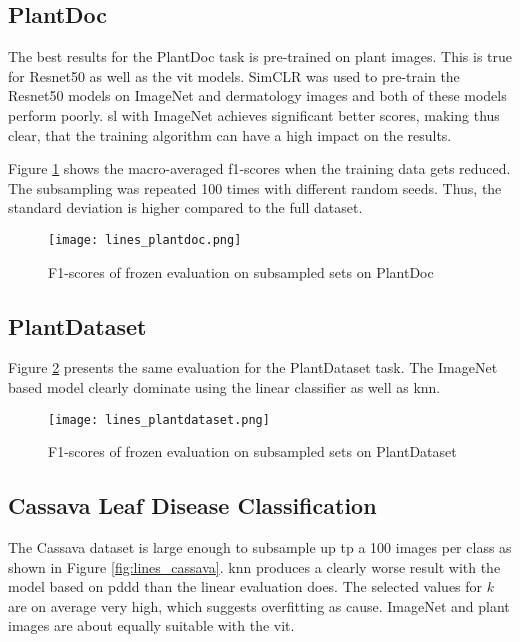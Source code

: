 \subsection{PlantDoc}
The best results for the PlantDoc task is pre-trained on plant images. 
This is true for Resnet50 as well as the \gls{vit} models.
SimCLR was used to pre-train the Resnet50 models on ImageNet and dermatology images and both of these models perform poorly.
\gls{sl} with ImageNet achieves significant better scores, making thus clear, that the training algorithm can have a high impact on the results. 

Figure \ref{fig:lines_plantdoc} shows the macro-averaged f1-scores when the training data gets reduced.
The subsampling was repeated 100 times with different random seeds. 
Thus, the standard deviation is higher compared to the full dataset.

\begin{figure}[H]
    \begin{center}
    \texttt{[image: lines\_plantdoc.png]}
    \caption{F1-scores of frozen evaluation on subsampled sets on PlantDoc}\label{fig:lines_plantdoc}
    \end{center}
\end{figure}

\subsection{PlantDataset}
Figure \ref{fig:lines_plantdataset} presents the same evaluation for the PlantDataset task.
The ImageNet based model clearly dominate using the linear classifier as well as \gls{knn}.
\begin{figure}[H]
    \begin{center}
    \texttt{[image: lines\_plantdataset.png]}
    \caption{F1-scores of frozen evaluation on subsampled sets on PlantDataset}\label{fig:lines_plantdataset}
    \end{center}
\end{figure}

\subsection{Cassava Leaf Disease Classification}
The Cassava dataset is large enough to subsample up tp a 100 images per class as shown in Figure \ref{fig:lines_cassava}.
\gls{knn} produces a clearly worse result with the model based on \gls{pddd} than the linear evaluation does.
The selected values for $k$ are on average very high, which suggests overfitting as cause.
ImageNet and plant images are about equally suitable with the \gls{vit}.

